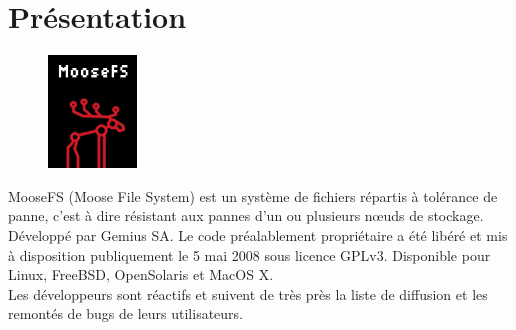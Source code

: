 \documentclass[12pt]{report}
\begin{document}
		\section{Présentation}

			\begin{figure}[H]
				\begin{center}
					\includegraphics[width=0.15\linewidth]{images/moosefs.png}
				\end{center}
			\end{figure}
	
				
			MooseFS (Moose File System) est un système de fichiers répartis à tolérance de panne,
			c’est à dire résistant aux pannes d’un ou plusieurs nœuds de stockage.
			Développé par Gemius SA. Le code préalablement propriétaire a été libéré et mis à disposition publiquement le 5 mai 2008
			sous licence GPLv3. Disponible pour Linux, FreeBSD, OpenSolaris et MacOS X.\\
			Les développeurs sont réactifs et suivent de très près la liste de diffusion et les remontés de bugs de leurs utilisateurs.
\end{document}
